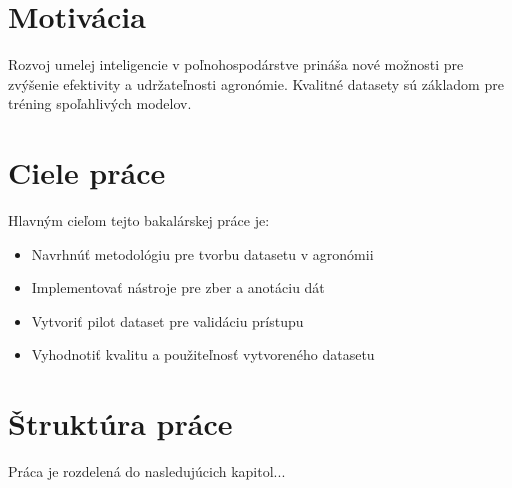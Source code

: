 \section{Motivácia}

Rozvoj umelej inteligencie v poľnohospodárstve prináša nové možnosti pre zvýšenie efektivity a udržateľnosti agronómie. Kvalitné datasety sú základom pre tréning spoľahlivých modelov.

\section{Ciele práce}

Hlavným cieľom tejto bakalárskej práce je:
\begin{itemize}
    \item Navrhnúť metodológiu pre tvorbu datasetu v agronómii
    \item Implementovať nástroje pre zber a anotáciu dát
    \item Vytvoriť pilot dataset pre validáciu prístupu
    \item Vyhodnotiť kvalitu a použiteľnosť vytvoreného datasetu
\end{itemize}

\section{Štruktúra práce}

Práca je rozdelená do nasledujúcich kapitol...
